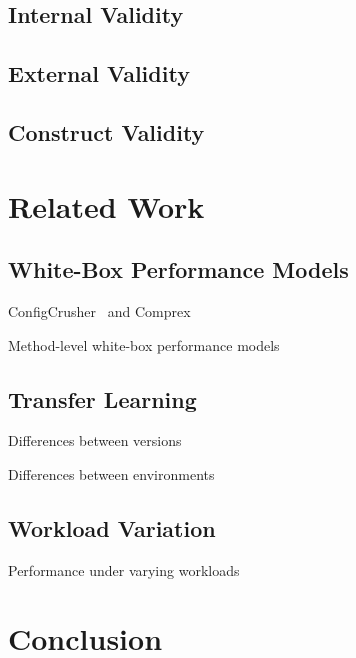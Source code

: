 \documentclass[conference]{IEEEtran}
\begin{document}
\subsection{Internal Validity}
\subsection{External Validity}
\subsection{Construct Validity}
\section{Related Work}
\subsection{White-Box Performance Models}
ConfigCrusher~\cite{velez_2020_configcrusher_jase} and Comprex~\cite{velez_comprex_2021}

Method-level white-box performance models~\cite{weber_white_2021}
\subsection{Transfer Learning}
Differences between versions\cite{muehlbauer_identifying_2020}

Differences between environments~\cite{jamishidi_transfer_2017,jamshidi_learning_2018,jamshidi_transfer_gp_2017,muehlbauer_identifying_2020}
\subsection{Workload Variation}
Performance under varying workloads~\cite{liao_2020_using_emse}
\section{Conclusion}

\clearpage


\end{document}
